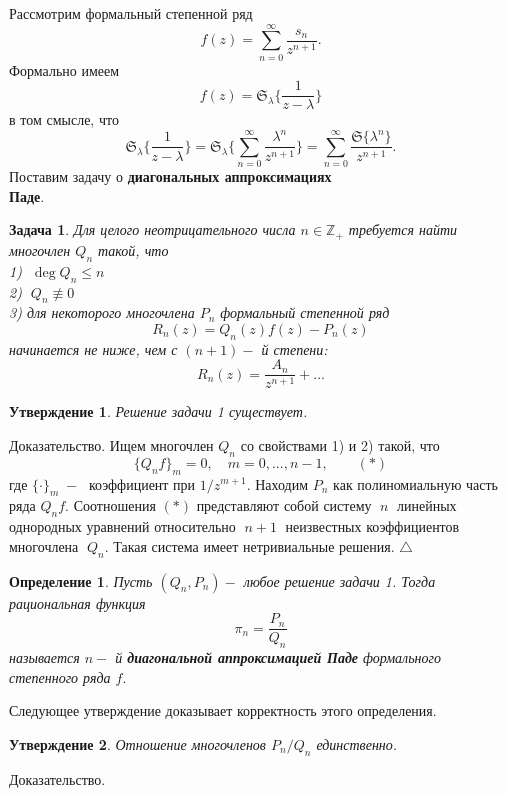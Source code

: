 \documentclass[12pt,a4paper]{article}
\theoremstyle{plain}   \newtheorem{Pro}{Задача}
\newtheorem{Sta}{Утверждение}
\newtheorem{Def}{Определение}
\begin{document}
Рассмотрим формальный степенной ряд
$$
  f(z)=\sum _{n=0}^{\infty}
  \frac{s_n }{z^{n+1}}.
$$
Формально имеем
$$
  f(z)=\mathfrak{S}_{\lambda} \biggl \{ \frac{1}{z- \lambda } \biggr \}
$$
в том смысле, что
$$
  \mathfrak{S}_{\lambda} \biggl \{ \frac{1}{z-\lambda} \biggr \}=
  \mathfrak{S}_{\lambda} \biggl \{
  \sum _{n=0}^{\infty}
  \frac{\lambda ^n }{z^{n+1}} \biggr \}=
  \sum _{n=0}^{\infty}
  \frac{\mathfrak{S} \{ \lambda ^n \} }{z^{n+1}}.
$$
Поставим задачу о
{\bfseries диагональных аппроксимациях\\
Паде}.
\begin{Pro}
Для целого неотрицательного числа
$ n \in \mathbb{Z}_+ $
требуется найти многочлен
$ Q_n $
такой, что
\\
1) $ \; \deg Q_n \leq n $\\
2) $ \; Q_n \not \equiv 0 $\\
3) для некоторого многочлена
$ P_n $
формальный степенной ряд
$$
  R_n (z)=Q_n (z) f(z)-P_n (z)
$$
начинается не ниже, чем с
$ (n+1)- $ й степени:
$$
  R_n (z)=\frac{A_n }{z^{n+1}}+...
$$
\end{Pro}
\begin{Sta}
Решение задачи 1 существует.
\end{Sta}
{\Large Доказательство.}
Ищем многочлен
$ Q_n $
со свойствами 1) и 2) такой, что
$$
  \{ Q_n f \} _m =0,
  \quad m=0,...,n-1,
  \qquad (\ast)
$$
где
$ \{ \cdot \} _m \; - \; $
коэффициент при
$ 1/z^{m+1}. $
Находим
$ P_n $
как полиномиальную часть ряда
$ Q_n f .$
Соотношения
$ (\ast) $
представляют собой систему
$ \; n \; $
линейных однородных уравнений относительно
$ \; n+1 \; $
неизвестных коэффициентов многочлена
$ \; Q_n . $
Такая система имеет нетривиальные решения.
$ \triangle $
\begin{Def}
Пусть
$ (Q_n , P_n ) - $
любое решение задачи 1. Тогда рациональная функция
$$
  \pi _n =\frac{ P_n }{Q_n }
$$
называется
$ n- $ й
{\bfseries диагональной аппроксимацией Паде}
формального степенного ряда
$ f . $
\end{Def}
Следующее утверждение доказывает корректность этого определения.
\begin{Sta}
Отношение многочленов
$ P_n /Q_n $
единственно.
\end{Sta}
{\Large Доказательство.}
\end{document}

